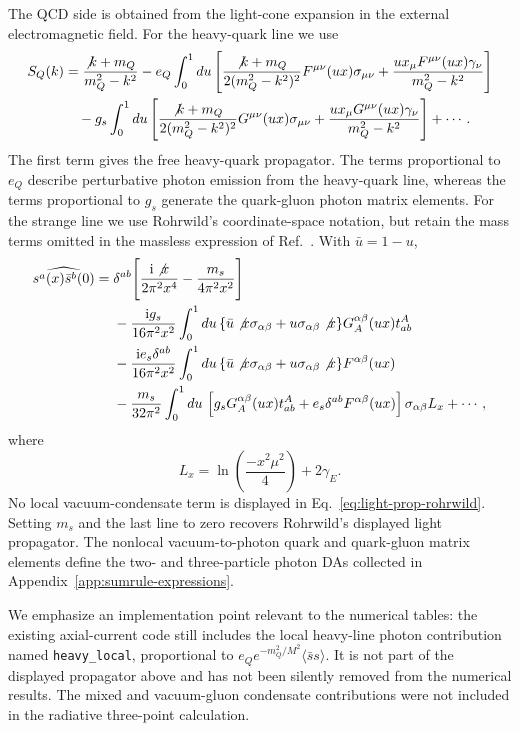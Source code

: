 \documentclass[aps,prd,preprint,nofootinbib,superscriptaddress]{revtex4-2}
\newcommand{\ii}{\mathrm{i}}
\begin{document}
The QCD side is obtained from the light-cone expansion in the external
electromagnetic field.  For the heavy-quark line we use
\begin{align}
  S_Q(k) &=
  \frac{\not k+m_Q}{m_Q^2-k^2}
  -e_Q\int_0^1du
  \left[
  \frac{\not k+m_Q}{2(m_Q^2-k^2)^2}
  F^{\mu\nu}(ux)\sigma_{\mu\nu}
  +\frac{u x_\mu F^{\mu\nu}(ux)\gamma_\nu}{m_Q^2-k^2}
  \right]
  \notag\\
  &\quad
  -g_s\int_0^1du
  \left[
  \frac{\not k+m_Q}{2(m_Q^2-k^2)^2}
  G^{\mu\nu}(ux)\sigma_{\mu\nu}
  +\frac{u x_\mu G^{\mu\nu}(ux)\gamma_\nu}{m_Q^2-k^2}
  \right]
  +\cdots .
  \label{eq:heavy-prop}
\end{align}
The first term gives the free heavy-quark propagator.  The terms proportional
to \(e_Q\) describe perturbative photon emission from the heavy-quark line,
whereas the terms proportional to \(g_s\) generate the quark-gluon photon
matrix elements.  For the strange line we use Rohrwild's coordinate-space
notation, but retain the mass terms omitted in the massless expression of
Ref.~\cite{Rohrwild:2007yt}.  With $\bar u=1-u$,
\begin{align}
  \widehat{s^a(x)\bar s^b(0)}={}&
  \delta^{ab}\Bigg[
    \frac{\ii\not x}{2\pi^2x^4}-\frac{m_s}{4\pi^2x^2}
  \Bigg]
  \notag\\
  &-\frac{\ii g_s}{16\pi^2x^2}\int_0^1du\,
  \{\bar u\not x\sigma_{\alpha\beta}
  +u\sigma_{\alpha\beta}\not x\}
  G_A^{\alpha\beta}(ux)t^A_{ab}
  \notag\\
  &-\frac{\ii e_s\delta^{ab}}{16\pi^2x^2}\int_0^1du\,
  \{\bar u\not x\sigma_{\alpha\beta}
  +u\sigma_{\alpha\beta}\not x\}F^{\alpha\beta}(ux)
  \notag\\
  &-\frac{m_s}{32\pi^2}\int_0^1du\,
  \left[g_sG_A^{\alpha\beta}(ux)t^A_{ab}
  +e_s\delta^{ab}F^{\alpha\beta}(ux)\right]
  \sigma_{\alpha\beta}L_x+\cdots,
  \label{eq:light-prop-rohrwild}
\end{align}
where
\begin{equation}
  L_x=\ln\left(\frac{-x^2\mu^2}{4}\right)+2\gamma_E.
\end{equation}
No local vacuum-condensate term is displayed in
Eq.~\eqref{eq:light-prop-rohrwild}.  Setting $m_s$ and the last line to zero
recovers Rohrwild's displayed light propagator.  The nonlocal
vacuum-to-photon quark and quark-gluon matrix elements define the two- and
three-particle photon DAs collected in
Appendix~\ref{app:sumrule-expressions}.

We emphasize an implementation point relevant to the numerical tables: the
existing axial-current code still includes the local heavy-line photon
contribution named \texttt{heavy\_local}, proportional to
$e_Q e^{-m_Q^2/M^2}\langle\bar s s\rangle$.  It is not part of the displayed
propagator above and has not been silently removed from the numerical results.
The mixed and vacuum-gluon condensate contributions were not included in the
radiative three-point calculation.
\end{document}
